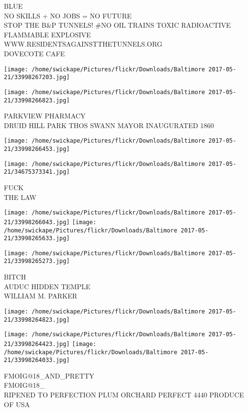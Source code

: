 \documentclass[10pt,letterpaper]{article}
\begin{document}
BLUE\\
NO SKILLS + NO JOBS = NO FUTURE\\
STOP THE B\&P TUNNELS!  \#NO OIL TRAINS TOXIC RADIOACTIVE FLAMMABLE EXPLOSIVE WWW.RESIDENTSAGAINSTTHETUNNELS.ORG\\
DOVECOTE CAFE
\pagebreak

\texttt{[image: /home/swickape/Pictures/flickr/Downloads/Baltimore 2017-05-21/33998267203.jpg]}

\vspace{0.25in}
\texttt{[image: /home/swickape/Pictures/flickr/Downloads/Baltimore 2017-05-21/33998266823.jpg]}

PARKVIEW PHARMACY\\
DRUID HILL PARK THOS SWANN MAYOR INAUGURATED 1860
\pagebreak

\texttt{[image: /home/swickape/Pictures/flickr/Downloads/Baltimore 2017-05-21/33998266453.jpg]}

\vspace{0.25in}
\texttt{[image: /home/swickape/Pictures/flickr/Downloads/Baltimore 2017-05-21/34675373341.jpg]}

FUCK\\
THE LAW
\pagebreak

\texttt{[image: /home/swickape/Pictures/flickr/Downloads/Baltimore 2017-05-21/33998266043.jpg]}
\texttt{[image: /home/swickape/Pictures/flickr/Downloads/Baltimore 2017-05-21/33998265633.jpg]}

\vspace{0.25in}
\texttt{[image: /home/swickape/Pictures/flickr/Downloads/Baltimore 2017-05-21/33998265273.jpg]}

BITCH\\
AUDUC HIDDEN TEMPLE\\
WILLIAM M. PARKER
\pagebreak

\texttt{[image: /home/swickape/Pictures/flickr/Downloads/Baltimore 2017-05-21/33998264823.jpg]}

\vspace{0.25in}
\texttt{[image: /home/swickape/Pictures/flickr/Downloads/Baltimore 2017-05-21/33998264423.jpg]}
\texttt{[image: /home/swickape/Pictures/flickr/Downloads/Baltimore 2017-05-21/33998264033.jpg]}

FMOIG@18\_AND\_PRETTY\\
FMOIG@18\_\\
RIPENED TO PERFECTION PLUM ORCHARD PERFECT 4440 PRODUCE OF USA
\pagebreak
\end{document}
